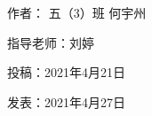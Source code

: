 \vspace{10pt}



作者： 五（3）班 何宇州



指导老师：刘婷



投稿：2021年4月21日



发表：2021年4月27日






                



\vspace{10pt}

\hline



